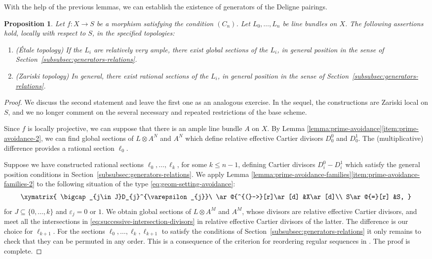 \documentclass[11pt]{article}
\let\epsilon\varepsilon
\theoremstyle{plain}
\newtheorem{proposition}[theorem]{Proposition}
\theoremstyle{definition}
\begin{document}
With the help of the previous lemmas, we can establish the existence of generators of the Deligne pairings.
\begin{proposition}\label{prop:construction-generators}
Let $f\colon X\to S$ be a morphism satisfying the condition $(C_{n})$. Let $L_{0},\ldots, L_{n}$ be line bundles on $X$. The following assertions hold, locally with respect to $S$, in the specified topologies:
\begin{enumerate}
\item\label{item:construction-generators-1} (Étale topology) If the $L_{i}$ are relatively very ample, there exist global sections of the $L_{i}$, in general position in the sense of Section~\ref{subsubsec:generators-relations}.
\item\label{item:construction-generators-2} (Zariski topology) In general, there exist rational sections of the $L_{i}$, in general position in the sense of Section~\ref{subsubsec:generators-relations}.
\end{enumerate}
\end{proposition}
\begin{proof}
We discuss the second statement and leave the first one as an analogous exercise. In the sequel, the constructions are Zariski local on $S$, and we no longer comment on the several necessary and repeated restrictions of the base scheme.

Since $f$ is locally projective, we can suppose that there is an ample line bundle $A$ on $X$. By Lemma \ref{lemma:prime-avoidance}\eqref{item:prime-avoidance-2}, we can find global sections of $L\otimes A^{N}$ and $A^{N}$ which define relative effective Cartier divisors $D_{0}^{0}$ and $D_{0}^{1}$. The (multiplicative) difference provides a rational section $\ell_{0}$.

Suppose we have constructed rational sections $\ell_{0},\ldots, \ell_{k}$, for some $k\leq n-1$, defining Cartier divisors $D_{i}^{0}-D_{i}^{1}$ which satisfy the general position conditions in Section~\ref{subsubsec:generators-relations}. We apply Lemma \ref{lemma:prime-avoidance-families}\eqref{item:prime-avoidance-families-2} to the following situation of the type \eqref{eq:geom-setting-avoidance}:
\begin{equation}\label{eq:successive-intersection-divisors}
\xymatrix{
\bigcap_{j\in J}D_{j}^{\epsilon_{j}}\ \ar@{^{(}->}[r]\ar[d] &X\ar[d]\\
S\ar@{=}[r] &S,
}
\end{equation}
for $J\subseteq\lbrace 0,\ldots, k\rbrace$ and $\epsilon_{j}= 0$ or $1$. We obtain global sections of $L\otimes A^{M}$ and $A^{M}$, whose divisors are relative effective Cartier divisors, and meet all the intersections in \eqref{eq:successive-intersection-divisors} in relative effective Cartier divisors of the latter. The difference is our choice for $\ell_{k+1}$. For the sections $\ell_{0},\ldots,\ell_{k},\ell_{k+1}$ to satisfy the conditions of Section~\ref{subsubsec:generators-relations} it only remains to check that they can be permuted in any order. This is a consequence of the criterion for reordering regular sequences in \cite[\href{https://stacks.math.columbia.edu/tag/01ZM}{07DW}]{stacks-project}. The proof is complete.
\end{proof}
\end{document}
